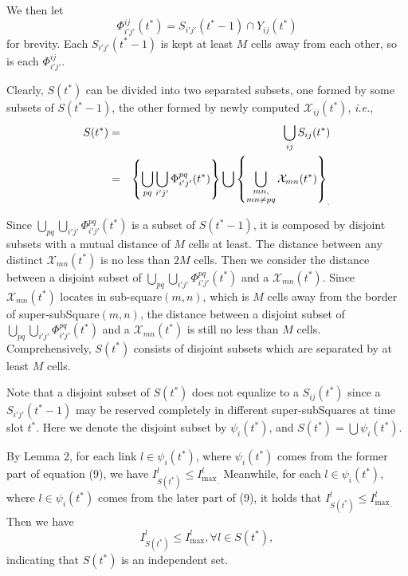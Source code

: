 \documentclass[journal]{IEEEtran}
\begin{document}
\begin{IEEEproof}
We then let
\begin{equation}
\Phi _{i'j'}^{ij} (t^\ast )=S_{i'j'} (t^\ast -1)\cap Y_{ij} (t^\ast)
\end{equation}
 for brevity. Each $S_{i'j'} (t^\ast -1)$ is kept at least $M$ cells away from each other,
so is each $\Phi _{i'j'}^{ij} $.


Clearly, $S(t^\ast )$ can be divided into two separated subsets, one formed by some subsets of $S(t^\ast -1)$, the other formed by newly computed $\mathcal{X}_{ij} (t^\ast )$, \emph{i.e.},
\vspace*{-0.5\baselineskip}
{\small{
\setlength{\arraycolsep}{0.0em}
\begin{eqnarray}
 S(t^\ast ) &=& \bigcup\limits_{ij} {S_{ij} (t^\ast )} \\
 &=& \left\{{\bigcup\limits_{pq} {\bigcup\limits_{i'j'} {\Phi _{i'j'}^{pq}
(t^\ast )} } } \right\}\bigcup \left\{ {\bigcup\limits_{\substack{mn,\\mn\ne pq}} {\mathcal{X}_{mn}
(t^\ast )} } \right\}_{.}
\vspace*{-3\baselineskip}
\end{eqnarray}
}}

Since $\bigcup\limits_{pq} {\bigcup\limits_{i'j'} {\Phi _{i'j'}^{pq} (t^\ast)} } $ is a subset of $S(t^\ast -1)$, it is composed by disjoint subsets with a mutual distance of  $M$ cells at least. The distance between any distinct $\mathcal{X}_{mn}(t^\ast )$ is no less than $2M$ cells. Then we consider the distance between a disjoint subset of $\bigcup\limits_{pq} {\bigcup\limits_{i'j'}{\Phi _{i'j'}^{pq} (t^\ast )} } $ and a $\mathcal{X}_{mn} (t^\ast )$. Since $\mathcal{X}_{mn}(t^\ast )$ locates in sub-square$(m,n)$, which is $M$ cells away from the border of super-subSquare$(m,n)$, the distance between a disjoint subset of $\bigcup\limits_{pq} {\bigcup\limits_{i'j'} {\Phi_{i'j'}^{pq} (t^\ast )} } $ and a $\mathcal{X}_{mn} (t^\ast )$ is still no less than $M$ cells. Comprehensively, $S(t^\ast )$ consists of disjoint subsets
which are separated by at least $M$ cells.

Note that a disjoint subset of $S(t^\ast )$ does not equalize to a $S_{ij} (t^\ast )$ since a $S_{i'j'} (t^\ast -1)$ may be reserved completely in different super-subSquares at time slot $t^\ast $. Here we denote the disjoint subset by $\psi _i (t^\ast )$, and $S(t^\ast )=\bigcup {\psi _i (t^\ast )} $.

By Lemma 2, for each link $l\in \psi _i (t^\ast )$, where $\psi _i (t^\ast)$ comes from
the former part of equation (9), we have
{\small{$ I_{S(t^\ast )}^l  \le {I_{\max }^l}_{.}$}}
Meanwhile, for each $l\in \psi _i (t^\ast )$, where $l\in \psi _i (t^\ast )$ comes
from
the later part of (9), it holds that
{\small{ $I_{S(t^\ast )}^l  \le {I_{\max }^l}_{.}$ }}
Then we have
\begin{equation}
I_{S(t^\ast )}^l  \le I_{\max}^l, \forall l\in S(t^\ast ),
\end{equation}
indicating that $S(t^\ast )$ is an independent set.


\end{IEEEproof}
\end{document}
